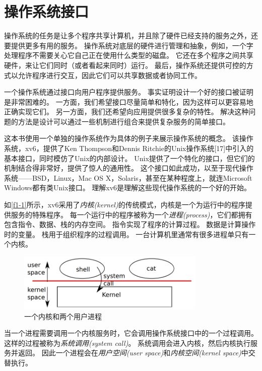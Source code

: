 \chapter{操作系统接口}

操作系统的任务是让多个程序共享计算机，并且除了硬件已经支持的服务之外，还要提供更多有用的服务。
操作系统对底层的硬件进行管理和抽象，例如，一个字处理程序不需要关心它自己正在使用什么类型的磁盘。
它还在多个程序之间共享硬件，来让它们同时（或者看起来同时）运行。
最后，操作系统还提供可控的方式以允许程序进行交互，因此它们可以共享数据或者协同工作。

一个操作系统通过接口向用户程序提供服务。
事实证明设计一个好的接口被证明是非常困难的。
一方面，我们希望接口尽量简单和特化，因为这样可以更容易地正确实现它们。
另一方面，我们还希望向应用提供很多复杂的特性。
解决这种问题的方法是设计可以通过一些机制进行组合来提供复杂服务的简单接口。

这本书使用一个单独的操作系统作为具体的例子来展示操作系统的概念。
该操作系统，xv6，提供了Ken Thompson和Dennis Ritchie的Unix操作系统[17]中引入的基本接口，同时模仿了Unix的内部设计。
Unix提供了一个特化的接口，但它们的机制结合得非常好，提供了惊人的通用性。
这个接口如此成功，以至于现代操作系统——BSD，Linux，Mac OS X，Solaris，甚至在某种程度上，就连Microsoft Windows都有类Unix接口。
理解xv6是理解这些现代操作系统的一个好的开始。

如\autoref{f1-1}所示，xv6采用了\emph{内核(kernel)}的传统模式，内核是一个为运行中的程序提供服务的特殊程序。
每一个运行中的程序被称为一个\emph{进程(process)}，它们都拥有包含指令、数据、栈的内存空间。
指令实现了程序的计算过程。
数据是计算操作时的变量。
栈用于组织程序的过程调用。
一台计算机里通常有很多进程单只有一个内核。

\begin{figure}[htbp]
    \centering
    \includegraphics[width=0.8\textwidth]{../imgs/f1-1.png}
    \caption{一个内核和两个用户进程}
    \label{f1-1}
\end{figure}

当一个进程需要调用一个内核服务时，它会调用操作系统接口中的一个过程调用。
这样的过程被称为\emph{系统调用(system call)}。
系统调用会进入内核，然后内核执行服务并返回。
因此一个进程会在\emph{用户空间(user space)}和\emph{内核空间(kernel space)}中交替执行。

